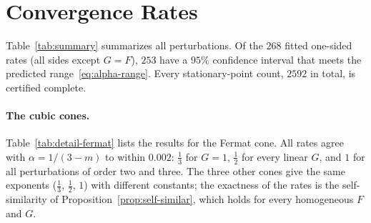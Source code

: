 \section{Convergence Rates}
\label{sec:exp-rates}

Table~\ref{tab:summary} summarizes all perturbations. Of the $268$ fitted
one-sided rates (all sides except $G=F$), $253$ have a $95\%$ confidence interval
that meets the predicted range~\eqref{eq:alpha-range}. Every stationary-point
count, $2592$ in total, is certified complete.


\paragraph{The cubic cones.} Table~\ref{tab:detail-fermat} lists the results
for the Fermat cone. All rates agree with $\alpha=1/(3-m)$ to within $0.002$: $\frac13$
for $G=1$, $\frac12$ for every linear $G$, and $1$ for all perturbations of
order two and three. The three other cones give the same exponents
($\frac13$, $\frac12$, $1$) with different constants; the exactness of the rates
is the self-similarity of Proposition~\ref{prop:self-similar}, which holds for
every homogeneous $F$ and $G$.



